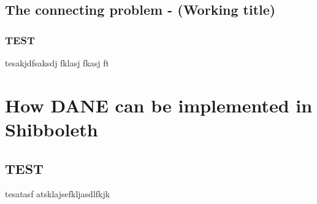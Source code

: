 \subsection{The connecting problem - (Working title)}
\subsubsection{TEST}
tesakjdfsaksdj fklasj fkasj ft
\section{How DANE can be implemented in Shibboleth} 
\subsection{TEST}
tesatasf atsklajsefkljasdlfkjk


